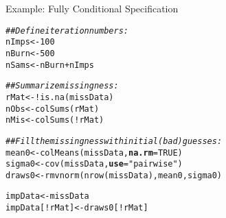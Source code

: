 \documentclass{beamer}\usepackage[]{graphicx}\usepackage[]{color}
\makeatletter
\newcommand{\hlnum}[1]{\textcolor[rgb]{0.69,0.494,0}{#1}}%
\newcommand{\hlstr}[1]{\textcolor[rgb]{0.749,0.012,0.012}{#1}}%
\newcommand{\hlcom}[1]{\textcolor[rgb]{0.514,0.506,0.514}{\textit{#1}}}%
\newcommand{\hlopt}[1]{\textcolor[rgb]{0,0,0}{#1}}%
\newcommand{\hlstd}[1]{\textcolor[rgb]{0,0,0}{#1}}%
\newcommand{\hlkwb}[1]{\textcolor[rgb]{0,0.341,0.682}{#1}}%
\newcommand{\hlkwc}[1]{\textcolor[rgb]{0,0,0}{\textbf{#1}}}%
\newcommand{\hlkwd}[1]{\textcolor[rgb]{0.004,0.004,0.506}{#1}}%
\newenvironment{kframe}{%
 \def\at@end@of@kframe{}%
 \ifinner\ifhmode%
  \def\at@end@of@kframe{\end{minipage}}%
  \begin{minipage}{\columnwidth}%
 \fi\fi%
 \def\FrameCommand##1{\hskip\@totalleftmargin \hskip-\fboxsep
 \colorbox{shadecolor}{##1}\hskip-\fboxsep
     \hskip-\linewidth \hskip-\@totalleftmargin \hskip\columnwidth}%
 \MakeFramed {\advance\hsize-\width
   \@totalleftmargin\z@ \linewidth\hsize
   \@setminipage}}%
 {\par\unskip\endMakeFramed%
 \at@end@of@kframe}
\newenvironment{knitrout}{}{} %
\makeatother
\begin{document}

\begin{frame}[fragile]{Example: Fully Conditional Specification}
  
\begin{knitrout}\footnotesize
{}\color{fgcolor}\begin{kframe}
\begin{alltt}
\hlcom{## Define iteration numbers:}
\hlstd{nImps} \hlkwb{<-} \hlnum{100}
\hlstd{nBurn} \hlkwb{<-} \hlnum{500}
\hlstd{nSams} \hlkwb{<-} \hlstd{nBurn} \hlopt{+} \hlstd{nImps}

\hlcom{## Summarize missingness:}
\hlstd{rMat} \hlkwb{<-} \hlopt{!}\hlkwd{is.na}\hlstd{(missData)}
\hlstd{nObs} \hlkwb{<-} \hlkwd{colSums}\hlstd{(rMat)}
\hlstd{nMis} \hlkwb{<-} \hlkwd{colSums}\hlstd{(}\hlopt{!}\hlstd{rMat)}

\hlcom{## Fill the missingness with initial (bad) guesses:}
\hlstd{mean0}  \hlkwb{<-} \hlkwd{colMeans}\hlstd{(missData,} \hlkwc{na.rm} \hlstd{=} \hlnum{TRUE}\hlstd{)}
\hlstd{sigma0} \hlkwb{<-} \hlkwd{cov}\hlstd{(missData,} \hlkwc{use} \hlstd{=} \hlstr{"pairwise"}\hlstd{)}
\hlstd{draws0} \hlkwb{<-} \hlkwd{rmvnorm}\hlstd{(}\hlkwd{nrow}\hlstd{(missData), mean0, sigma0)}

\hlstd{impData}        \hlkwb{<-} \hlstd{missData}
\hlstd{impData[}\hlopt{!}\hlstd{rMat]} \hlkwb{<-} \hlstd{draws0[}\hlopt{!}\hlstd{rMat]}
\end{alltt}
\end{kframe}
\end{knitrout}

\end{frame}

\end{document}
